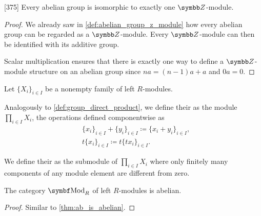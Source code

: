 \begin{proposition}\label{thm:abelian_group_iff_z_module}\cite{Knapp2016BAlg}[375]
  Every abelian group is isomorphic to exactly one \( \Z \)-module.
\end{proposition}
\begin{proof}
  We already saw in \cref{def:abelian_group_z_module} how every abelian group can be regarded as a \( \Z \)-module. Every \( \Z \)-module can then be identified with its additive group.

  Scalar multiplication ensures that there is exactly one way to define a \( \Z \)-module structure on an abelian group since \( na = (n-1)a + a \) and \( 0a = 0 \).
\end{proof}

\begin{definition}\label{def:left_module_direct_product}
  Let \( \{ X_i \}_{i \in I} \) be a nonempty family of left \( R \)-modules.

  Analogously to \cref{def:group_direct_product}, we define their  as the module \( \prod_{i \in I} X_i \), the operations defined componentwise as
  \begin{align*}
    &\{ x_i \}_{i \in I} + \{ y_i \}_{i \in I}
    \coloneqq
    \{ x_i + y_i \}_{i \in I}, \\
    &t \{ x_i \}_{i \in I}
    \coloneqq
    t \{ t x_i \}_{i \in I}.
  \end{align*}

  We define their  as the submodule of \( \prod_{i \in I} X_i \) where only finitely many components of any module element are different from zero.
\end{definition}

\begin{proposition}\label{thm:mod_r_is_abelian}
  The category \( \Cat{Mod}_R \) of left \( R \)-modules is abelian.
\end{proposition}
\begin{proof}
  Similar to \cref{thm:ab_is_abelian}.
\end{proof}

